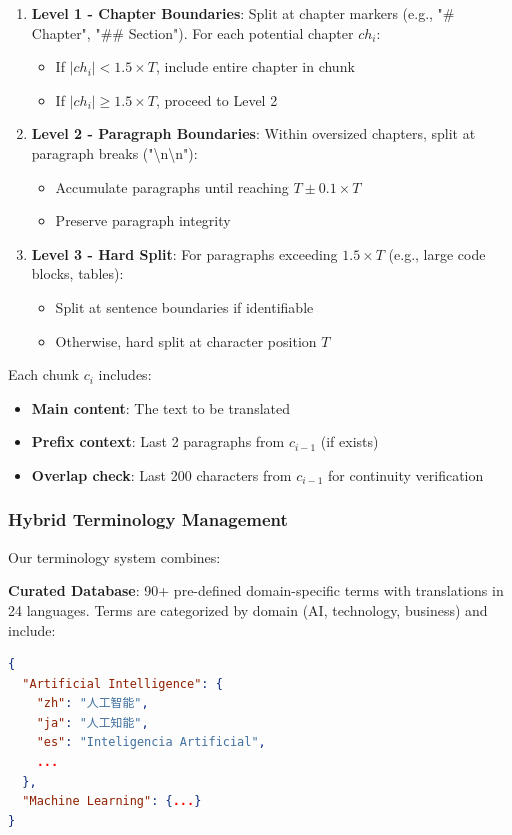 \documentclass[11pt]{article}
\begin{document}
\begin{enumerate}
    \item \textbf{Level 1 - Chapter Boundaries}: Split at chapter markers (e.g., "# Chapter", "## Section"). For each potential chapter $ch_i$:
    \begin{itemize}
        \item If $|ch_i| < 1.5 \times T$, include entire chapter in chunk
        \item If $|ch_i| \geq 1.5 \times T$, proceed to Level 2
    \end{itemize}
    
    \item \textbf{Level 2 - Paragraph Boundaries}: Within oversized chapters, split at paragraph breaks ("\textbackslash n\textbackslash n"):
    \begin{itemize}
        \item Accumulate paragraphs until reaching $T \pm 0.1 \times T$
        \item Preserve paragraph integrity
    \end{itemize}
    
    \item \textbf{Level 3 - Hard Split}: For paragraphs exceeding $1.5 \times T$ (e.g., large code blocks, tables):
    \begin{itemize}
        \item Split at sentence boundaries if identifiable
        \item Otherwise, hard split at character position $T$
    \end{itemize}
\end{enumerate}

Each chunk $c_i$ includes:
\begin{itemize}
    \item \textbf{Main content}: The text to be translated
    \item \textbf{Prefix context}: Last 2 paragraphs from $c_{i-1}$ (if exists)
    \item \textbf{Overlap check}: Last 200 characters from $c_{i-1}$ for continuity verification
\end{itemize}

\subsubsection{Hybrid Terminology Management}

Our terminology system combines:

\textbf{Curated Database}: 90+ pre-defined domain-specific terms with translations in 24 languages. Terms are categorized by domain (AI, technology, business) and include:
\begin{lstlisting}[language=json,caption=Terminology Database Example]
{
  "Artificial Intelligence": {
    "zh": "人工智能",
    "ja": "人工知能",
    "es": "Inteligencia Artificial",
    ...
  },
  "Machine Learning": {...}
}
\end{lstlisting}
\end{document}
